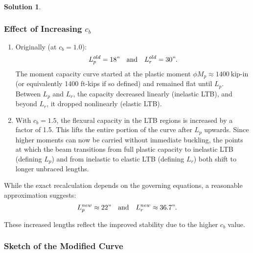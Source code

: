 \documentclass[12pt]{article}
\theoremstyle{definition} %
\newtheorem{solution}{Solution}
\theoremstyle{plain} %
\begin{document}
\begin{solution}
\begin{enumerate}
\subsubsection*{Effect of Increasing $ c_b $}
\begin{enumerate}
    \item Originally (at $ c_b = 1.0 $):
  \begin{align}
  L_p^{old} = 18" \quad \text{and} \quad L_r^{old} = 30".
  \end{align}
  The moment capacity curve started at the plastic moment $\phi M_p \approx 1400~\text{kip-in}$ (or equivalently 1400 ft-kips if so defined) and remained flat until $ L_p $. Between $ L_p $ and $ L_r $, the capacity decreased linearly (inelastic LTB), and beyond $ L_r $, it dropped nonlinearly (elastic LTB).

 \item With $ c_b = 1.5 $, the flexural capacity in the LTB regions is increased by a factor of 1.5. This lifts the entire portion of the curve after $ L_p $ upwards. Since higher moments can now be carried without immediate buckling, the points at which the beam transitions from full plastic capacity to inelastic LTB (defining $ L_p $) and from inelastic to elastic LTB (defining $ L_r $) both shift to longer unbraced lengths.


\end{enumerate}
While the exact recalculation depends on the governing equations, a reasonable approximation suggests:
\begin{align}
L_p^{new} \approx 22" \quad \text{and} \quad L_r^{new} \approx 36.7".
\end{align}

These increased lengths reflect the improved stability due to the higher $ c_b $ value.

\subsubsection*{Sketch of the Modified Curve}

\end{enumerate}
\end{solution}
\end{document}
